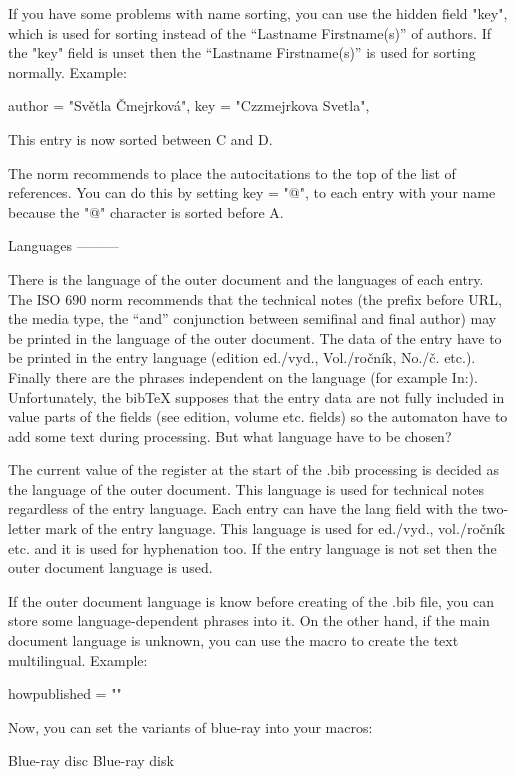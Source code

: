 If you have some problems with name sorting, you can use the hidden field
"key", which is used for sorting instead of the ``Lastname Firstname(s)''
of authors. If the "key" field is unset then the ``Lastname Firstname(s)'' 
is used for sorting normally. Example:

  author    = "Světla Čmejrková",
  key       = "Czzmejrkova Svetla",

This entry is now sorted between C and D. 

The norm recommends to place the autocitations to the top of the list of
references. You can do this by setting  key = "@", to each entry with your
name because the "@" character is sorted before A.


Languages
---------

There is the language of the outer document and the languages of each entry.
The ISO 690 norm recommends that the technical notes (the prefix before URL,
the media type, the ``and'' conjunction between semifinal and final author)
may be printed in the language of the outer document. The data of the entry
have to be printed in the entry language (edition ed./vyd., Vol./ročník,
No./č. etc.). Finally there are the phrases independent on the language
(for example In:). Unfortunately, the bibTeX supposes that the entry data
are not fully included in value parts of the fields (see edition, volume
etc. fields) so the automaton have to add some text during processing.
But what language have to be chosen?

The current value of the \language register at the start of the .bib
processing is decided as the language of the outer document. This language
is used for technical notes regardless of the entry language. Each entry can
have the lang field with the two-letter mark of the entry language. This
language is used for ed./vyd., vol./ročník etc. and it is used for
hyphenation too. If the entry language is not set then the outer document
language is used.

If the outer document language is know before creating of the .bib file, you
can store some language-dependent phrases into it. On the other hand, if the
main document language is unknown, you can use the \Mtext macro to
create the text multilingual. Example:

   howpublished = ""

Now, you can set the variants of blue-ray into your macros:

     {Blue-ray disc}  {Blue-ray disk} {}


